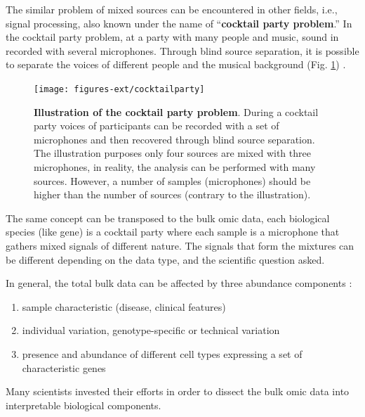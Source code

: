 \documentclass[12pt,]{book}
\providecommand{\tightlist}{%
  \setlength{\itemsep}{0pt}\setlength{\parskip}{0pt}}
\theoremstyle{definition}
\theoremstyle{definition}
\theoremstyle{definition}
\theoremstyle{remark}
\begin{document}
The similar problem of mixed sources can be encountered in other fields,
i.e., signal processing, also known under the name of ``\textbf{cocktail
party problem}.'' In the cocktail party problem, at a party with many
people and music, sound in recorded with several microphones. Through
blind source separation, it is possible to separate the voices of
different people and the musical background (Fig.
\ref{fig:cocktailparty}) \citep{Cherry1953}.

\begin{figure}

{\centering \texttt{[image: figures-ext/cocktailparty]} 

}

\caption[illutration of the cocktail party problem]{\textbf{Illustration of the cocktail party
problem}. During a cocktail party voices of participants can be recorded
with a set of microphones and then recovered through blind source
separation. The illustration purposes only four sources are mixed with
three microphones, in reality, the analysis can be performed with many
sources. However, a number of samples (microphones) should be higher
than the number of sources (contrary to the illustration).}\label{fig:cocktailparty}
\end{figure}









The same concept can be transposed to the bulk omic data, each
biological species (like gene) is a cocktail party where each sample is
a microphone that gathers mixed signals of different nature. The signals
that form the mixtures can be different depending on the data type, and
the scientific question asked.

In general, the total bulk data can be affected by three abundance
components \citep{Shen-Orr2013}:

\begin{enumerate}
\def\labelenumi{\arabic{enumi}.}
\tightlist
\item
  sample characteristic (disease, clinical features)
\item
  individual variation, genotype-specific or technical variation
\item
  presence and abundance of different cell types expressing a set of
  characteristic genes
\end{enumerate}

Many scientists invested their efforts in order to dissect the bulk omic
data into interpretable biological components.
\end{document}
